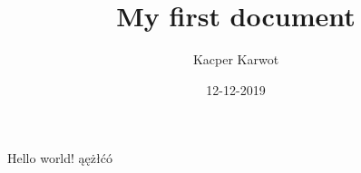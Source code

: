 \documentclass{report}
\title{My first document}
\date{12-12-2019}
\author{Kacper Karwot}
\begin{document}
	\maketitle
	\newpage

Hello world!
ąężłćó
\end{document}

